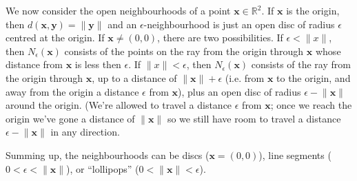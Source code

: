 \documentclass[letterpaper,12pt]{article}
\newcommand{\len}[1]{\lVert #1\rVert}
\newcommand{\R}{\mathbb{R}}
\newcommand{\x}{\mathbf{x}}
\newcommand{\y}{\mathbf{y}}
\begin{document}
\begin{enumerate}
We now consider the open neighbourhoods of a point $\x\in\R^2$. If $\x$ is the origin, then $d(\x,\y) = \len{\y}$ and an $\epsilon$-neighbourhood is just an open disc of radius $\epsilon$ centred at the origin. If $\x\neq (0,0)$, there are two possibilities. If $\epsilon<\len{x}$, then $N_\epsilon(\x)$ consists of the points on the ray from the origin through $\x$ whose distance from $\x$ is less then $\epsilon$. If $\len{x}<\epsilon$, then $N_\epsilon(\x)$ consists of the ray from the origin through $\x$, up to a distance of $\len{\x}+\epsilon$ (i.e. from $\x$ to the origin, and away from the origin a distance $\epsilon$ from $\x$), plus an open disc of radius $\epsilon-\len{\x}$ around the origin. (We're allowed to travel a distance $\epsilon$ from $\x$; once we reach the origin we've gone a distance of $\len{\x}$ so we still have room to travel a distance $\epsilon-\len{\x}$ in any direction.

Summing up, the neighbourhoods can be discs ($\x = (0,0)$), line segments ($0<\epsilon<\len{\x}$), or ``lollipops'' ($0<\len{\x}<\epsilon$).
\end{enumerate}
\end{document}
